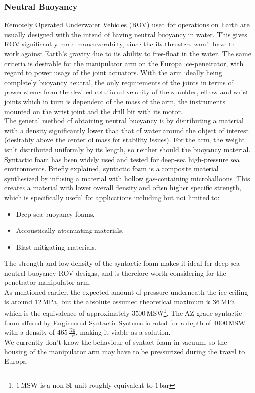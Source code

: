 \subsubsection{Neutral Buoyancy}
Remotely Operated Underwater Vehicles (ROV) used for operations on Earth are usually designed with the intend of having neutral buoyancy in water. This gives ROV significantly more maneuverabilty, since the its thrusters won't have to work against Earth's gravity due to its ability to free-float in the water. The same criteria is desirable for the manipulator arm on the Europa ice-penetrator, with regard to power usage of the joint actuators. With the arm ideally being completely buoyancy neutral, the only requirements of the joints in terms of power stems from the desired rotational velocity of the shoulder, elbow and wrist joints which in turn is dependent of the mass of the arm, the instruments mounted on the wrist joint and the drill bit with its motor.\\
The general method of obtaining neutral buoyancy is by distributing a material with a density significantly lower than that of water around the object of interest (desirably above the center of mass for stability issues). For the arm, the weight isn't distributed uniformly by its length, so neither should the buoyancy material. Syntactic foam has been widely used and tested for deep-sea high-pressure sea environments. Briefly explained, syntactic foam is a composite material synthesized by infusing a material with hollow gas-containing microballoons. This creates a material with lower overall density and often higher specific strength, which is specifically useful for applications including but not limited to:
\begin{itemize}
\item Deep-sea buoyancy foams.
\item Accoustically attenuating materials.
\item Blast mitigating materials.
\end{itemize}
The strength and low density of the syntactic foam makes it ideal for deep-sea neutral-buoyancy ROV designs, and is therefore worth considering for the penetrator manipulator arm.\\
As mentioned earlier, the expected amount of pressure underneath the ice-ceiling is around $12\,\mathrm{MPa}$, but the absolute assumed theoretical maximum is $36\,\mathrm{MPa}$ which is the equivalence of approximately $3500\,\mathrm{MSW}$\footnote{$1\, \mathrm{MSW}$ is a non-SI unit roughly equivalent to $1\, \mathrm{bar}$}. The AZ-grade syntactic foam offered by Engineered Syntactic Systems is rated for a depth of $4000\,\mathrm{MSW}$ with a density of $465\,\mathrm{\frac{Kg}{m^3}}$, making it viable as a solution.\\
We currently don't know the behaviour of syntact foam in vacuum, so the housing of the manipulator arm may have to be pressurized during the travel to Europa.

